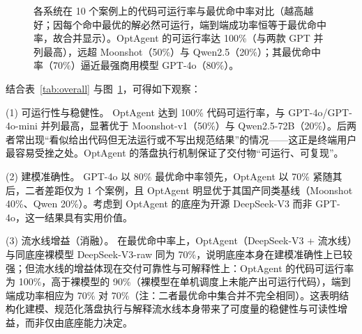\documentclass[11pt]{article}
\begin{document}
\begin{figure}[t]
\centering
{}
\caption{各系统在 10 个案例上的代码可运行率与最优命中率对比（越高越好；因每个命中最优的解必然可运行，端到端成功率恒等于最优命中率，故合并显示）。OptAgent 的可运行率达 100\%（与两款 GPT 并列最高），远超 Moonshot（50\%）与 Qwen2.5（20\%）；其最优命中率（70\%）逼近最强商用模型 GPT-4o（80\%）。}
\label{fig:overall-bar}
\end{figure}

结合表~\ref{tab:overall} 与图~\ref{fig:overall-bar}，可得如下观察：

(1) 可运行性与稳健性。 OptAgent 达到 100\% 代码可运行率，与 GPT-4o/GPT-4o-mini 并列最高，显著优于 Moonshot-v1（50\%）与 Qwen2.5-72B（20\%）。后两者常出现“看似给出代码但无法运行或不写出规范结果”的情况——这正是终端用户最容易受挫之处。OptAgent 的落盘执行机制保证了交付物“可运行、可复现”。

(2) 建模准确性。 GPT-4o 以 80\% 最优命中率领先，OptAgent 以 70\% 紧随其后，二者差距仅为 1 个案例，且 OptAgent 明显优于其国产同类基线（Moonshot 40\%、Qwen 20\%）。考虑到 OptAgent 的底座为开源 DeepSeek-V3 而非 GPT-4o，这一结果具有实用价值。

(3) 流水线增益（消融）。 在最优命中率上，OptAgent（DeepSeek-V3 + 流水线）与同底座裸模型 DeepSeek-V3-raw 同为 70\%，说明底座本身在建模准确性上已较强；但流水线的增益体现在交付可靠性与可解释性上：OptAgent 的代码可运行率为 100\%，高于裸模型的 90\%（裸模型在单机调度上未能产出可运行代码），端到端成功率相应为 70\% 对 70\%（注：二者最优命中集合并不完全相同）。这表明结构化建模、规范化落盘执行与解释流水线本身带来了可度量的稳健性与可读性增益，而非仅由底座能力决定。
\end{document}
